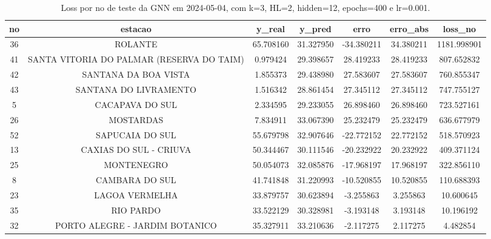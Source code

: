 \begin{table}[h]
\centering
\caption{Loss por no de teste da GNN em 2024-05-04, com k=3, HL=2, hidden=12, epochs=400 e lr=0.001.}
\label{tab:gnn_loss_k3_hl2_h12_e400_d20240504}
\begin{tabular}{ccccccc}
\toprule
no & estacao & y\_real & y\_pred & erro & erro\_abs & loss\_no \\
\midrule
36 & ROLANTE & 65.708160 & 31.327950 & -34.380211 & 34.380211 & 1181.998901 \\
41 & SANTA VITORIA DO PALMAR (RESERVA DO TAIM) & 0.979424 & 29.398657 & 28.419233 & 28.419233 & 807.652832 \\
42 & SANTANA DA BOA VISTA & 1.855373 & 29.438980 & 27.583607 & 27.583607 & 760.855347 \\
43 & SANTANA DO LIVRAMENTO & 1.516342 & 28.861454 & 27.345112 & 27.345112 & 747.755127 \\
5 & CACAPAVA DO SUL & 2.334595 & 29.233055 & 26.898460 & 26.898460 & 723.527161 \\
26 & MOSTARDAS & 7.834911 & 33.067390 & 25.232479 & 25.232479 & 636.677979 \\
52 & SAPUCAIA DO SUL & 55.679798 & 32.907646 & -22.772152 & 22.772152 & 518.570923 \\
13 & CAXIAS DO SUL - CRIUVA & 50.344467 & 30.111546 & -20.232922 & 20.232922 & 409.371124 \\
25 & MONTENEGRO & 50.054073 & 32.085876 & -17.968197 & 17.968197 & 322.856110 \\
8 & CAMBARA DO SUL & 41.741848 & 31.220993 & -10.520855 & 10.520855 & 110.688393 \\
23 & LAGOA VERMELHA & 33.879757 & 30.623894 & -3.255863 & 3.255863 & 10.600645 \\
35 & RIO PARDO & 33.522129 & 30.328981 & -3.193148 & 3.193148 & 10.196192 \\
32 & PORTO ALEGRE - JARDIM BOTANICO & 35.327911 & 33.210636 & -2.117275 & 2.117275 & 4.482854 \\
\bottomrule
\end{tabular}
\end{table}
